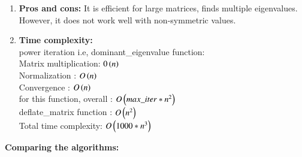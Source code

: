 \documentclass[journal]{IEEEtran}
\begin{document}
\begin{enumerate}
\begin{enumerate}
     \item \textbf{Pros and cons:} It is efficient for large matrices, finds multiple eigenvalues. However, it does not work well with non-symmetric values.
    \item \textbf{Time complexity:} \\
    power iteration i.e, dominant\_eigenvalue function:\\
    Matrix multiplication: $0\left(n\right)$\\
    Normalization : $O\left(n\right)$\\
    Convergence : $O\left(n\right)$\\
    for this function, overall : $O\left(max\_iter*n^2\right)$\\
    deflate\_matrix function : $O\left(n^2\right)$\\
    Total time complexity: $O\left(1000*n^3\right)$
\end{enumerate}
\end{enumerate}
\textbf{Comparing the algorithms:}\\
\end{document}
